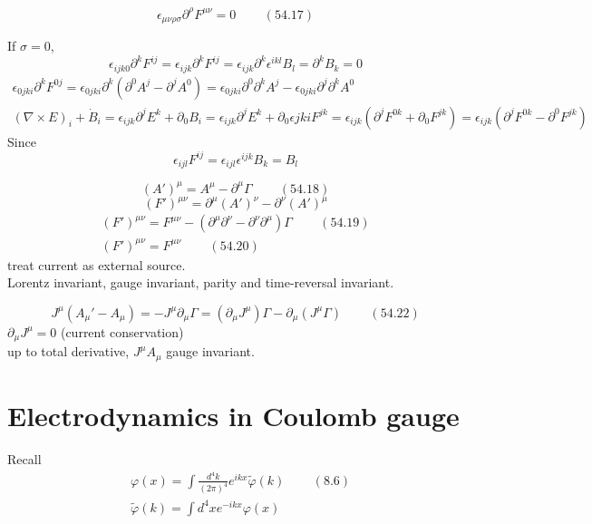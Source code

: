 \documentclass[twoside]{amsart}
\begin{document}
\[
\epsilon_{ \mu \nu \rho \sigma } \partial^{\rho} F^{\mu \nu } = 0 \quad \quad \, (54.17)
\]

If $\sigma= 0$, 
\[
\epsilon_{ijk0} \partial^k F^{ij} = \epsilon_{ijk} \partial^k F^{ij} = \epsilon_{ijk} \partial^k \epsilon^{ikl} B_l = \partial^k B_k = 0 
\]
\[
\begin{gathered}
  \epsilon_{ 0jki } \partial^k F^{0j} = \epsilon_{ 0jki} \partial^k ( \partial^0 A^j - \partial^j A^0) = \epsilon_{ 0jki } \partial^0 \partial^k  A^j - \epsilon_{ 0 jki } \partial^j \partial^k A^0  \\
  (\nabla \times E)_i + \dot{B}_i = \epsilon_{ijk} \partial^j E^k + \partial_0 B_i = \epsilon_{ijk} \partial^j E^k + \partial_0 \epsilon{jki} F^{jk} = \epsilon_{ijk} ( \partial^j F^{0k} + \partial_0 F^{jk} ) = \epsilon_{ijk} (\partial^j F^{0k} - \partial^0 F^{jk} )  
\end{gathered}
\]
Since 
\[
\epsilon_{ijl} F^{ij} = \epsilon_{ijl} \epsilon^{ijk} B_k = B_l
\]

\[
(A')^{\mu} = A^{\mu} - \partial^{\mu} \Gamma \quad \quad \, (54.18)
\]
\[
(F')^{\mu \nu} = \partial^{\mu}  (A')^{\nu} - \partial^{\nu} (A')^{\mu}
\]
\[
\begin{gathered}
  (F')^{\mu \nu} = F^{\mu \nu} - (\partial^{\mu } \partial^{\nu} - \partial^{\nu} \partial^{\mu} ) \Gamma \quad \quad \, (54.19) \\
 (F')^{\mu \nu} = F^{\mu \nu} \quad \quad \, (54.20 )
\end{gathered}
\]
treat current as external source. \\
Lorentz invariant, gauge invariant, parity and time-reversal invariant.   

\[
J^{\mu} ( A_{\mu}' - A_{\mu} ) = - J^{\mu} \partial_{\mu} \Gamma = (\partial_{\mu} J^{\mu} ) \Gamma - \partial_{\mu} (J^{\mu} \Gamma ) \quad \quad \, (54.22)
\]
$\partial_{\mu} J^{\mu} =0$ (current conservation) \\
up to total derivative, $J^{\mu } A_{\mu}$ gauge invariant. 





\section{Electrodynamics in Coulomb gauge}

Recall 
\[
\begin{aligned}
  & \varphi(x) = \int \frac{ d^4 k}{ (2\pi)^4} e^{ikx} \widetilde{ \varphi}(k) \quad \quad \, (8.6) \\ 
  & \widetilde{\varphi}(k) = \int d^4x e^{ -ikx} \varphi(x)
\end{aligned}
\]
\end{document}
